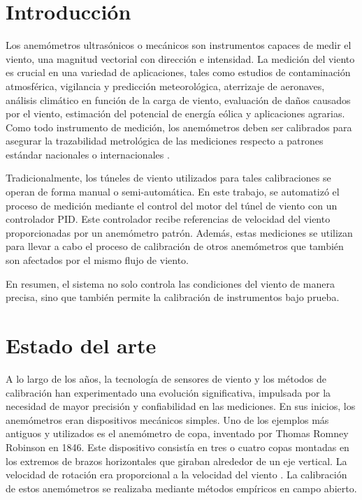 \section{Introducción}

Los anemómetros ultrasónicos o mecánicos son instrumentos capaces de medir el viento, una magnitud vectorial con dirección e intensidad. La medición del viento es crucial en una variedad de aplicaciones, tales como estudios de contaminación atmosférica, vigilancia y predicción meteorológica, aterrizaje de aeronaves, análisis climático en función de la carga de viento, evaluación de daños causados por el viento, estimación del potencial de energía eólica y aplicaciones agrarias. Como todo instrumento de medición, los anemómetros deben ser calibrados para asegurar la trazabilidad metrológica de las mediciones respecto a patrones estándar nacionales o internacionales \cite{wmoChapter8}.

Tradicionalmente, los túneles de viento utilizados para tales calibraciones se operan de forma manual o semi-automática. En este trabajo, se automatizó el proceso de medición mediante el control del motor del túnel de viento con un controlador PID. Este controlador recibe referencias de velocidad del viento proporcionadas por un anemómetro patrón. Además, estas mediciones se utilizan para llevar a cabo el proceso de calibración de otros anemómetros que también son afectados por el mismo flujo de viento.

En resumen, el sistema no solo controla las condiciones del viento de manera precisa, sino que también permite la calibración de instrumentos bajo prueba.

\section{Estado del arte}\label{sec:estado_del_arte}
A lo largo de los años, la tecnología de sensores de viento y los métodos de calibración han experimentado una evolución significativa, impulsada por la necesidad de mayor precisión y confiabilidad en las mediciones. En sus inicios, los anemómetros eran dispositivos mecánicos simples. Uno de los ejemplos más antiguos y utilizados es el anemómetro de copa, inventado por Thomas Romney Robinson en 1846. Este dispositivo consistía en tres o cuatro copas montadas en los extremos de brazos horizontales que giraban alrededor de un eje vertical. La velocidad de rotación era proporcional a la velocidad del viento \cite{robinson1846}. La calibración de estos anemómetros se realizaba mediante métodos empíricos en campo abierto.

